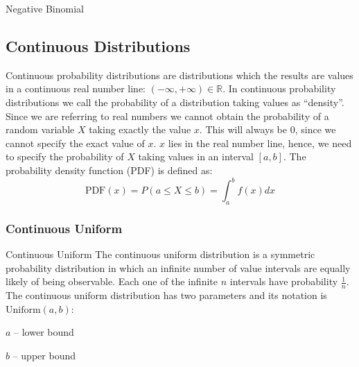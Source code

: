 \begin{frame}{Negative Binomial}
	\centering
\end{frame}


\subsection{Continuous Distributions}
\begin{frame}
	\begin{defn}
		\small
		Continuous probability distributions are distributions which
		the results are values in a continuous real number line:
		$(-\infty, +\infty) \in \mathbb{R}$.
		In continuous probability distributions we call the probability
		of a distribution taking values as ``density''.
		Since we are referring to real numbers we cannot obtain the
		probability of a random variable $X$ taking exactly the value $x$.
		This will always be $0$, since we cannot specify the exact
		value of $x$. $x$ lies in the real number line, hence,
		we need to specify the probability of $X$ taking values in an
		interval $[a,b]$.
		The probability density function (PDF) is defined as:
		$$\text{PDF}(x) = P(a \leq X \leq b) = \int_a^b f(x) dx$$
	\end{defn}
\end{frame}

\subsubsection{Continuous Uniform}
\begin{frame}{Continuous Uniform}
	The continuous uniform distribution is a symmetric probability distribution
	in which an infinite number of value intervals are equally likely of being observable.
	Each one of the infinite $n$ intervals have probability $\frac{1}{n}$.
	\vfill
	The continuous uniform distribution has two parameters and its notation is $\text{Uniform}(a, b)$:
	\begin{vfilleditems}
		\item $a$ -- lower bound
		\item $b$ -- upper bound
	\end{vfilleditems}
\end{frame}

